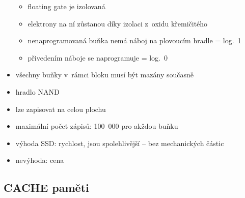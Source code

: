 \documentclass[a4paper,12pt]{article}
\providecommand{\tightlist}{%
\setlength{\itemsep}{0pt}\setlength{\parskip}{0pt}}
\begin{document}
\begin{itemize}
\begin{minipage}[b]{0.5\textwidth}
    \begin{itemize}
      \tightlist
      \item floating gate je izolovaná
      \item elektrony na ní zůstanou díky izolaci z~oxidu křemičitého
      \item nenaprogramovaná buňka nemá náboj na plovoucím hradle = log.~1
      \item přivedením náboje se naprogramuje = log.~0
    \end{itemize}
  \end{minipage}
  \item všechny buňky v~rámci bloku musí být mazány současně
  \item hradlo NAND
  \item lze zapisovat na celou plochu
  \item maximální počet zápisů: 100~000 pro akždou buňku
  \item výhoda SSD: rychlost, jsou spolehlivější -- bez mechanických částic
  \item nevýhoda: cena
\end{itemize}

\subsection{CACHE paměti}
\end{document}
